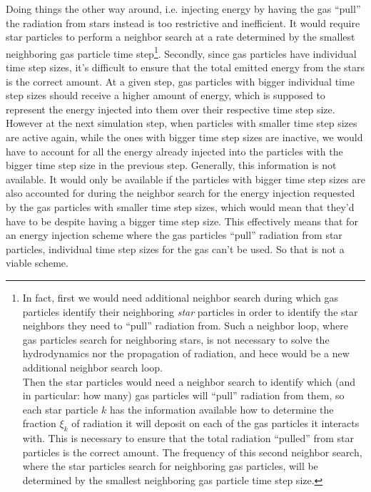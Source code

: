 Doing things the other way around, i.e. injecting energy by having the gas ``pull'' the radiation
from stars instead is too restrictive and inefficient. It would require star particles to perform a
neighbor search at a rate determined by the smallest neighboring gas particle time step\footnote{
In fact, first we would need additional neighbor search during which gas particles identify their
neighboring \emph{star} particles in order to identify the star neighbors they need to ``pull''
radiation from. Such a neighbor loop, where gas particles search for neighboring stars, is not
necessary to solve the hydrodynamics nor the propagation of radiation, and hece would be a new
additional neighbor search loop. \\
%
Then the star particles would need a neighbor search to identify which (and
in particular: how many) gas particles will ``pull'' radiation from them, so each star particle $k$
has the information available how to determine the fraction $\xi_k$ of radiation it will deposit on
each of the gas particles it interacts with. This is necessary to ensure that the total radiation
``pulled'' from star particles is the correct amount. The frequency of this second neighbor search,
where the star particles search for neighboring gas particles, will be determined by the smallest
neighboring gas particle time step size.
}.
Secondly, since gas particles have individual time step sizes, it's difficult to ensure that the
total emitted energy from the stars is the correct amount. At a given step, gas particles with
bigger individual time step sizes should receive a higher amount of energy, which is supposed to
represent the energy injected into them over their respective time step size. However at the next
simulation step, when particles with smaller time step sizes are active again, while the ones with
bigger time step sizes are inactive, we would have to account for all the energy already injected
into the particles with the bigger time step size in the previous step. Generally, this information
is not available. It would only be available if the particles with bigger time step sizes are also
accounted for during the neighbor search for the energy injection requested by the gas particles
with smaller time step sizes, which would mean that they'd have to be  despite having
a bigger time step size. This effectively means that for an energy injection scheme where the gas
particles ``pull'' radiation from star particles, individual time step sizes for the gas can't be
used. So that is not a viable scheme.

